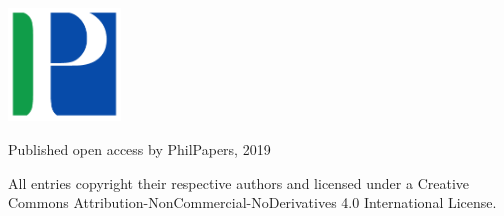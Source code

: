     \begin{center}
        \large

        \hfill

        \vfill

        \begingroup
            \color{Maroon}\spacedallcaps{\myTitle} \\ \bigskip
        \endgroup

        \textls[120]{\scshape \myName}

        \vfill

        \includegraphics[width=3cm]{PhilPapers} \\ \medskip


        Published open access by PhilPapers, 2019
        
        \vfill

        {\small All entries copyright \textcopyright\xspace their respective authors and licensed under a Creative 
        Commons Attribution-NonCommercial-NoDerivatives 4.0 International License.}

        \vfill

    \thispagestyle{empty}
    \end{center}
